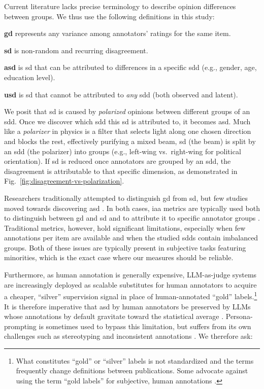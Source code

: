 \documentclass[manuscript,screen,review,anonymous]{acmart}
\theoremstyle{acmplain}
\theoremstyle{researchquestionstyle}
\begin{document}
Current literature lacks precise terminology to describe opinion differences between groups. We thus use the following definitions in this study:
\begin{enumerate*}
	\item \textbf{\ac{gd}} represents any variance among annotators' ratings for the same item.
	\item  \textbf{\ac{sd}} is non-random and recurring disagreement.
	\item \textbf{\ac{asd}} is \ac{sd} that can be attributed to differences in a specific \ac{sdd} (e.g., gender, age, education level).
	\item \textbf{\ac{usd}} is \ac{sd} that cannot be attributed to \textit{any} \ac{sdd} (both observed and latent).
\end{enumerate*}
We posit that \ac{sd} is caused by \emph{polarized} opinions between different groups of an \ac{sdd}. Once we discover which \ac{sdd} this \ac{sd} is attributed to, it becomes \ac{asd}. Much like a \emph{polarizer} in physics is a filter that selects light along one chosen direction and blocks the rest, effectively purifying a mixed beam, \ac{sd} (the beam) is split by an \ac{sdd} (the polarizer) into groups (e.g., left-wing vs.\ right-wing for political orientation). If \ac{sd} is reduced once annotators are grouped by an \ac{sdd}, the disagreement is attributable to that specific dimension, as demonstrated in Fig.~\ref{fig:disagreement-vs-polarization}.

Researchers traditionally attempted to distinguish \ac{gd} from \ac{sd}, but few studies moved towards discovering \ac{asd} \citep{pavlopoulos-likas-2024, ding-etal-2022-impact, wan2023everyones}. In both cases, \ac{iaa} metrics are typically used both to distinguish between \ac{gd} and \ac{sd} and to attribute it to specific annotator groups \citep{ding-etal-2022-impact, wan2023everyones}. Traditional metrics, however, hold significant limitations, especially when few annotations per item are available and when the studied \acp{sdd} contain imbalanced groups. Both of these issues are typically present in subjective tasks featuring minorities, which is the exact case where our measures should be reliable. 

Furthermore, as human annotation is generally expensive, LLM-as-judge systems are increasingly deployed as scalable substitutes for human annotators \citep{rossi_2024, kapania-etal-2025-examining} to acquire a cheaper, ``silver'' supervision signal in place of human-annotated ``gold'' labels.\footnote{What constitutes ``gold'' or ``silver'' labels is not standardized and the terms frequently change definitions between publications. Some advocate against using the term ``gold labels'' for subjective, human annotations \citep{fleisig-etal-2024-perspectivist, valerio_2021_gold}.} It is therefore imperative that \ac{asd} by human annotators be preserved by LLMs whose annotations by default gravitate toward the statistical average \citep{bisbee_2023}. Persona-prompting is sometimes used to bypass this limitation, but suffers from its own challenges such as stereotyping and inconsistent annotations \citep{lutz-etal-2025-prompt, liu-etal-2024-evaluating-large}. We therefore ask:
\end{document}
